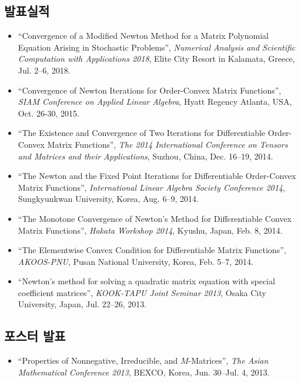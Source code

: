 \documentclass[11pt]{article} %
\begin{document}
\subsection*{발표실적}
\renewcommand\labelitemi{\tiny$\bullet$}
\newcommand\mypresent{
	\begin{itemize}[leftmargin=*]
		\item ``Convergence of a Modified Newton Method for a Matrix Polynomial Equation Arising in Stochastic Problems'', {\it Numerical Analysis and Scientific Computation with Applications 2018}, Elite City Resort in Kalamata, Greece, Jul. 2--6, 2018.
		\item ``Convergence of Newton Iterations for Order-Convex Matrix Functions'', {\it SIAM Conference on Applied Linear Algebra}, Hyatt Regency Atlanta, USA, Oct. 26-30, 2015.
		\item ``The Existence and Convergence of Two Iterations for Differentiable Order-Convex Matrix Functions'', {\it The 2014 International Conference on Tensors and Matrices and their Applications}, Suzhou, China, Dec. 16--19, 2014.
		\item ``The Newton and the Fixed Point Iterations for Differentiable Order-Convex Matrix Functions'', {\it International Linear Algebra Society Conference 2014}, Sungkyunkwan University, Korea, Aug. 6--9, 2014.
		\item ``The Monotone Convergence of Newton’s Method for Differentiable Convex Matrix Functions'', {\it Hakata Workshop 2014}, Kyushu, Japan, Feb. 8, 2014.
		\item ``The Elementwise Convex Condition for Differentiable Matrix Functions'', {\it AKOOS-PNU}, Pusan National University, Korea, Feb. 5--7, 2014.
		\item ``Newton’s method for solving a quadratic matrix equation with special coefficient matrices'', {\it KOOK-TAPU Joint Seminar 2013}, Osaka City University, Japan, Jul. 22--26, 2013.
		
	\end{itemize}
}
\mypresent

\subsection*{포스터 발표}
\newcommand\myposter{
	\begin{itemize}[leftmargin=*]
		\item ``Properties of Nonnegative, Irreducible, and $M$-Matrices'', {\it The Asian Mathematical Conference 2013}, BEXCO, Korea, Jun. 30--Jul. 4, 2013.
	\end{itemize}
}
\myposter
\end{document}
